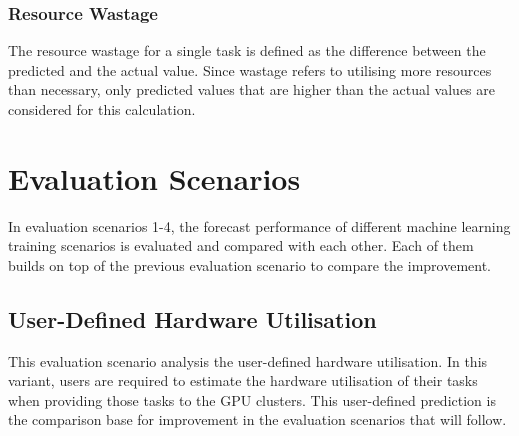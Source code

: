 

    \subsubsection{Resource Wastage}
    \label{sec:resource-wastage-metric-evaluation}

      The resource wastage for a single task is defined as the difference between the predicted and the actual value. Since wastage refers to utilising more resources than necessary, only predicted values that are higher than the actual values are considered for this calculation.

\section{Evaluation Scenarios}
\label{sec:evaluation-scenarios}

    In evaluation scenarios 1-4, the forecast performance of different machine learning training scenarios is evaluated and compared with each other. Each of them builds on top of the previous evaluation scenario to compare the improvement.

  \subsection{User-Defined Hardware Utilisation}
  \label{sec:user-defined-hardware-prediction-evaluation-scenario}

      This evaluation scenario analysis the user-defined hardware utilisation. 
      In this variant, users are required to estimate the hardware utilisation of their tasks when providing those tasks to the GPU clusters.
      This user-defined prediction is the comparison base for improvement in the evaluation scenarios that will follow.

